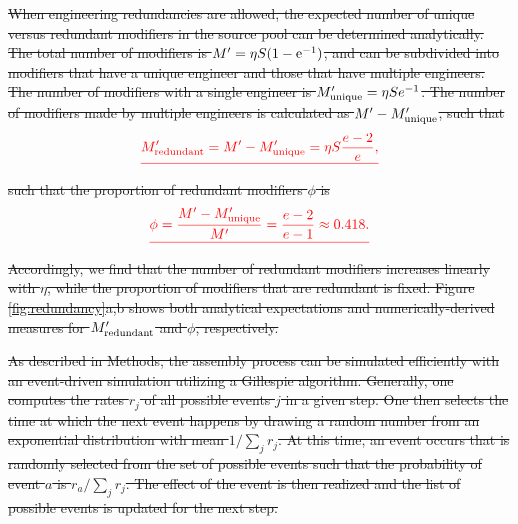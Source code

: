 \documentclass[twocolumn,preprintnumbers,amsmath,amssymb,superscriptaddress,linenumbers]{revtex4-1}
\newcommand{\rr}[1]{{\rm #1}}
\providecommand{\DIFdel}[1]{{\protect\color{red}\sout{#1}}}                      %
\begin{document}
\DIFdel{When engineering redundancies are allowed, the expected number of unique versus redundant modifiers in the source pool can be determined analytically.
The total number of modifiers is $M^\prime = \eta S (1 - \rr{e}^{-1})$, and can be subdivided into modifiers that have a unique engineer and those that have multiple engineers.
The number of modifiers with a single engineer is $M^\prime_{\rr{unique}} = \eta S e^{-1}$.
The number of modifiers made by multiple engineers is calculated as $M^\prime - M^\prime_{\rr{unique}}$, such that
}\begin{displaymath}
\DIFdel{M^\prime_{\rr{redundant}} =M^\prime - M^\prime_{\rr{unique}}= \eta S \frac{e - 2}{e},
}\end{displaymath}%
\DIFdel{such that the proportion of redundant modifiers $\phi$ is
}\begin{displaymath}
\DIFdel{\phi = \frac{M^\prime - M^\prime_{\rr{unique}}}{M^\prime} = \frac{e-2}{e-1} \approx 0.418.
}\end{displaymath}%
\DIFdel{Accordingly, we find that the number of redundant modifiers increases linearly with $\eta$, while the proportion of modifiers that are redundant is fixed.
Figure \ref{fig:redundancy}a,b shows both analytical expectations and numerically-derived measures for $M^\prime_{\rr{redundant}}$ and $\phi$, respectively.
}%

\DIFdel{As described in Methods, the assembly process can be simulated efficiently with an event-driven simulation utilizing a Gillespie algorithm.
Generally, one computes the rates $r_j$ of all possible events $j$ in a given step.
One then selects the time at which the next event happens by drawing a random number from an exponential distribution with mean $1/\sum_j{r_j}$.
At this time, an event occurs that is randomly selected from the set of possible events such that the probability of event $a$ is $r_a/\sum_j{r_j}$.
The effect of the event is then realized and the list of possible events is updated for the next step.
}%
\end{document}
